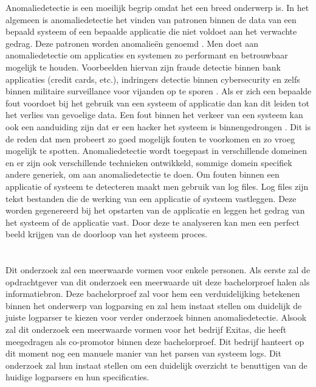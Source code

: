 Anomaliedetectie is een moeilijk begrip omdat het een breed onderwerp is. In het algemeen is anomaliedetectie het vinden van patronen binnen de data van een bepaald systeem of een bepaalde applicatie die niet voldoet aan het verwachte gedrag. Deze patronen worden anomalieën genoemd \autocite{chandola2009anomaly}. Men doet aan anomaliedetectie om applicaties en systemen zo performant en betrouwbaar mogelijk te houden. Voorbeelden hiervan zijn fraude detectie binnen bank applicaties (credit cards, etc.), indringers detectie binnen cybersecurity en zelfs binnen militaire surveillance voor vijanden op te sporen \autocite{chandola2009anomaly}. Als er zich een bepaalde fout voordoet bij het gebruik van een systeem of applicatie dan kan dit leiden tot het verlies van gevoelige data. Een fout binnen het verkeer van een systeem kan ook een aanduiding zijn dat er een hacker het systeem is binnengedrongen \autocite{chandola2009anomaly}. Dit is de reden dat men probeert zo goed mogelijk fouten te voorkomen en zo vroeg mogelijk te spotten. Anomaliedetectie wordt toegepast in verschillende domeinen en er zijn ook verschillende technieken ontwikkeld, sommige domein specifiek andere generiek, om aan anomaliedetectie te doen. Om fouten binnen een applicatie of systeem te detecteren maakt men gebruik van log files. Log files zijn tekst bestanden die de werking van een applicatie of systeem vastleggen. Deze worden gegenereerd bij het opstarten van de applicatie en leggen het gedrag van het systeem of de applicatie vast. Door deze te analyseren kan men een perfect beeld krijgen van de doorloop van het systeem proces.

\section{}
\label{sec:probleemstelling}


Dit onderzoek zal een meerwaarde vormen voor enkele personen. Als eerste zal de opdrachtgever van dit onderzoek een meerwaarde uit deze bachelorproef halen als informatiebron. Deze bachelorproef zal voor hem een verduidelijking betekenen binnen het onderwerp van logparsing en zal hem instaat stellen om duidelijk de juiste logparser te kiezen voor verder onderzoek binnen anomaliedetectie. Alsook zal dit onderzoek een meerwaarde vormen voor het bedrijf Exitas, die heeft meegedragen als co-promotor binnen deze bachelorproef. Dit bedrijf hanteert op dit moment nog een manuele manier van het parsen van systeem logs. Dit onderzoek zal hun instaat stellen om een duidelijk overzicht te benuttigen van de huidige logparsers en hun specificaties. 


